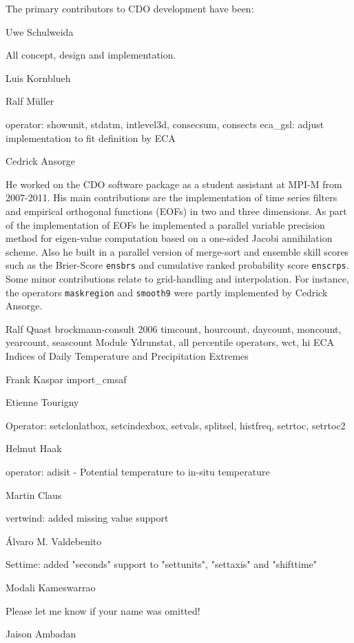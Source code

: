The primary contributors to CDO development have been: 

Uwe Schulweida

All concept, design and implementation.

Luis Kornblueh

Ralf Müller

operator: showunit, stdatm, intlevel3d, consecsum, consects
eca_gsl: adjust implementation to fit definition by ECA

Cedrick Ansorge

He worked on the CDO software package as a student assistant at MPI-M from 2007-2011.
His main contributions are the implementation of {time series filters} and {empirical orthogonal functions (EOFs)} in two and three dimensions. 
As part of the implementation of EOFs he implemented a parallel variable precision method for eigen-value computation based on a one-sided 
Jacobi annihilation scheme. 
Also he built in a parallel version of merge-sort and ensemble skill scores such as the {Brier-Score} \texttt{ensbrs} and
{cumulative ranked probability score} \texttt{enscrps}.
Some minor contributions relate to grid-handling and interpolation. For instance, the operators \texttt{maskregion} and \texttt{smooth9} 
were partly implemented by Cedrick Ansorge.

Ralf Quast brockmann-consult 2006
timcount, hourcount, daycount, moncount, yearcount, seascount
Module Ydrunstat, all percentile operators, 
wct, hi
ECA Indices of Daily Temperature and Precipitation Extremes

Frank Kaspar
import_cmsaf

Etienne Tourigny

Operator: setclonlatbox, setcindexbox, setvals, splitsel, histfreq, setrtoc, setrtoc2

Helmut Haak

operator: adisit - Potential temperature to in-situ temperature

Martin Claus

vertwind: added missing value support

Álvaro M. Valdebenito

Settime: added "seconds" support to "settunits", "settaxis" and "shifttime"

Modali Kameswarrao


Please let me know if your name was omitted!


Jaison Ambadan
